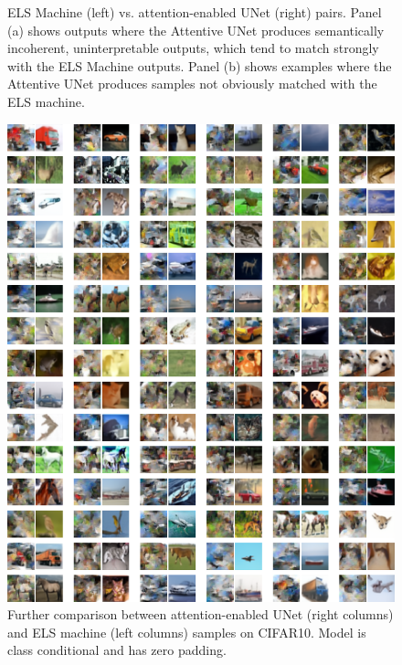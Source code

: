 \documentclass{article}
\theoremstyle{plain}
\theoremstyle{definition}
\theoremstyle{remark}
\begin{document}
\begin{figure}
    \caption{ELS Machine (left) vs. attention-enabled UNet (right) pairs. Panel (a) shows outputs where the Attentive UNet produces semantically incoherent, uninterpretable outputs, which tend to match strongly with the ELS Machine outputs. Panel (b) shows examples where the Attentive UNet produces samples not obviously matched with the ELS machine.}
\end{figure}



\begin{figure}
    \centering
    \includegraphics[width=0.9\linewidth]{cifar10_zeros_samps_attention_multiscale.png}
    \caption{Further comparison between attention-enabled UNet (right columns) and ELS machine (left columns) samples on CIFAR10. Model is class conditional and has zero padding.}
    \label{fig:cifar10-zeros-attention}
\end{figure}







\end{document}
